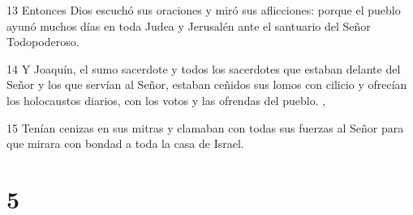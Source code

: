 \par 13 Entonces Dios escuchó sus oraciones y miró sus aflicciones: porque el pueblo ayunó muchos días en toda Judea y Jerusalén ante el santuario del Señor Todopoderoso.
\par 14 Y Joaquín, el sumo sacerdote y todos los sacerdotes que estaban delante del Señor y los que servían al Señor, estaban ceñidos sus lomos con cilicio y ofrecían los holocaustos diarios, con los votos y las ofrendas del pueblo. ,
\par 15 Tenían cenizas en sus mitras y clamaban con todas sus fuerzas al Señor para que mirara con bondad a toda la casa de Israel.

\chapter{5}

